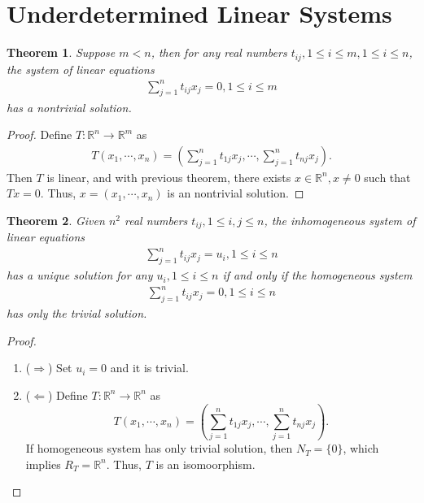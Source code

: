 \documentclass[10pt]{book}
\newtheorem{theorem}{Theorem}[chapter]
\theoremstyle{definition}
\numberwithin{equation}{chapter}
\begin{document}
\medskip

\section{Underdetermined Linear Systems}
\begin{theorem}
Suppose $m < n$, then for any real numbers $t_{ij}, 1\leq i\leq m, 1\leq i\leq n$, the system of linear equations
\begin{align*}
    \sum^n_{j=1}t_{ij} x_j = 0, 1\leq i \leq m
\end{align*}
has a nontrivial solution.
\end{theorem}
\begin{proof}
Define $T:\mathbb{R}^n\to\mathbb{R}^m$ as
\begin{align*}
    T(x_1,\cdots,x_n) = \left(\sum^n_{j=1}t_{1j} x_j, \cdots, \sum^n_{j=1}t_{nj} x_j\right).
\end{align*}
Then $T$ is linear, and with previous theorem, there exists $x\in\mathbb{R}^n, x\neq 0$ such that $T x = 0$. Thus, $x = (x_1,\cdots,x_n)$ is an nontrivial solution.
\end{proof}

\medskip

\begin{theorem}
Given $n^2$ real numbers $t_{ij}, 1\leq i,j\leq n$, the inhomogeneous system of linear equations
\begin{align*}
    \sum^n_{j=1}t_{ij} x_j = u_i, 1\leq i \leq n
\end{align*}
has a unique solution for any $u_i, 1\leq i \leq n$ if and only if the homogeneous system
\begin{align*}
    \sum^n_{j=1}t_{ij} x_j = 0, 1\leq i \leq n
\end{align*}
has only the trivial solution.
\end{theorem}
\begin{proof}
~\begin{enumerate}[label=(\arabic*)]
    \item ($\Rightarrow$) Set $u_i = 0$ and it is trivial.
    \item ($\Leftarrow$) Define $T:\mathbb{R}^n\to\mathbb{R}^n$ as 
    $$T(x_1,\cdots,x_n) = \left(\sum^n_{j=1}t_{1j} x_j, \cdots, \sum^n_{j=1}t_{nj} x_j\right).$$
    If homogeneous system has only trivial solution, then $N_T = \{0\}$, which implies $R_T = \mathbb{R}^n$. Thus, $T$ is an isomoorphism. 
\end{enumerate}
\end{proof}
\end{document}
